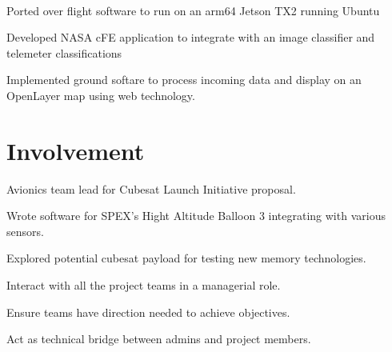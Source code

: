 \documentclass[]{deedy-resume-openfont}
\begin{document}
\\
\begin{tightemize}
	\item Ported over flight software to run on an arm64 Jetson TX2 running Ubuntu
	\item Developed NASA cFE application to integrate with an image classifier and telemeter classifications
	\item Implemented ground softare to process incoming data and display on an OpenLayer map using web technology.
\end{tightemize}

\sectionsep

\section{Involvement}
\raggedright

\begin{tightemize}
	\item Avionics team lead for Cubesat Launch Initiative proposal.
	\item Wrote software for SPEX's Hight Altitude Balloon 3 integrating with various sensors.
	\item Explored potential cubesat payload for testing new memory technologies.
\end{tightemize}
\begin{tightemize}
	\item Interact with all the project teams in a managerial role.
	\item Ensure teams have direction needed to achieve objectives.
	\item Act as technical bridge between admins and project members.
\end{tightemize}
	
\sectionsep
\end{document}
